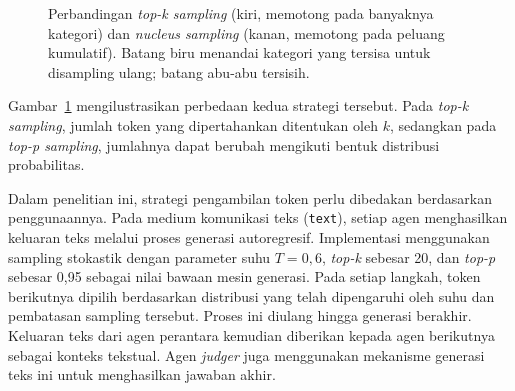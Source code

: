 \begin{figure}[H]
\centering
{}
\caption{Perbandingan \textit{top-k sampling} (kiri, memotong pada
banyaknya kategori) dan \textit{nucleus sampling} (kanan, memotong pada
peluang kumulatif). Batang biru menandai kategori yang tersisa untuk
disampling ulang; batang abu-abu tersisih.}
\label{fig:sampling}
\end{figure}

Gambar~\ref{fig:sampling} mengilustrasikan perbedaan kedua strategi
tersebut. Pada \textit{top-k sampling}, jumlah token yang
dipertahankan ditentukan oleh $k$, sedangkan pada
\textit{top-p sampling}, jumlahnya dapat berubah mengikuti
bentuk distribusi probabilitas.

Dalam penelitian ini, strategi pengambilan token perlu dibedakan
berdasarkan penggunaannya. Pada medium komunikasi teks
(\texttt{text}), setiap agen menghasilkan keluaran teks melalui
proses generasi autoregresif. Implementasi menggunakan sampling
stokastik dengan parameter suhu $T=0{,}6$, \textit{top-k} sebesar
20, dan \textit{top-p} sebesar 0{,}95 sebagai nilai bawaan mesin
generasi. Pada setiap langkah, token berikutnya dipilih berdasarkan
distribusi yang telah dipengaruhi oleh suhu dan pembatasan
sampling tersebut. Proses ini diulang hingga generasi berakhir.
Keluaran teks dari agen perantara kemudian diberikan kepada agen
berikutnya sebagai konteks tekstual. Agen \textit{judger} juga
menggunakan mekanisme generasi teks ini untuk menghasilkan
jawaban akhir.



